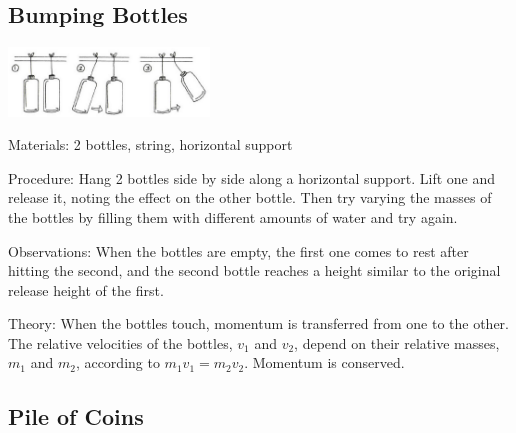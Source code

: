 \begin{multicols}{2}
\subsection{Bumping Bottles}

\begin{center}
\includegraphics[width=0.4\textwidth]{./img/vso/bumping-bottles.png}
\end{center}

\begin{description*}
\item[Materials:]{2 bottles, string, horizontal support}
\item[Procedure:]{Hang 2 bottles side by side along a horizontal support. Lift one and release it, noting the effect on the other bottle. Then try varying the masses of the bottles by filling them with different amounts of water and try again.}
\item[Observations:]{When the bottles are empty, the first one comes to rest after hitting the second, and the second bottle reaches a height similar to the original release height of the first.}
\item[Theory:]{When the bottles touch, momentum is transferred from one to the other. The relative velocities of the bottles, $v_1$ and $v_2$, depend on their relative masses, $m_1$ and $m_2$, according to $m_1v_1 = m_2v_2$. Momentum is conserved.}
\end{description*}

\subsection{Pile of Coins}



\end{multicols}
